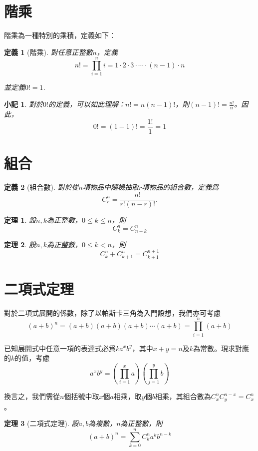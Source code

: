 \documentclass[12pt]{article}
\newtheorem{definition}{定義}
\newtheorem*{theorem}{定理}
\newtheorem*{remark}{小記}
\begin{document}
    \section*{階乘}

    階乘為一種特別的乘積，定義如下：

    \begin{definition}[階乘]
        對任意正整數$n$，定義$$n!=\prod_{i=1}^n i=1\cdot2\cdot3\cdot\cdots\cdot (n-1)\cdot n$$

        並定義$0!=1$.
    \end{definition}

    \begin{remark}
        對於$0!$的定義，可以如此理解：$n!=n(n-1)!$，則$(n-1)!=\frac{n!}{n}$。因此，$$0!=(1-1)!=\frac{1!}{1}=1$$
    \end{remark}

    \section*{組合}

    \begin{definition}[組合數]
        對於從$n$項物品中隨機抽取$r$項物品的組合數，定義爲$$C_r^n=\frac{n!}{r!(n-r)!}.$$
    \end{definition}

    \begin{theorem}
        設$n,k$為正整數，$0\leq k\leq n$，則$$C_k^n=C_{n-k}^n$$
    \end{theorem}

    \begin{theorem}
        設$n,k$為正整數，$0\leq k< n$，則$$C_k^n+C_{k+1}^n=C_{k+1}^{n+1}$$
    \end{theorem}

    \section*{二項式定理}

    對於二項式展開的係數，除了以帕斯卡三角為入門設想，我們亦可考慮$$(a+b)^n=(a+b)(a+b)(a+b)\cdots(a+b)=\prod_{i=1}^{n}(a+b)$$

    已知展開式中任意一項的表達式必爲$ka^xb^y$，其中$x+y=n$及$k$為常數。現求對應的$k$的值，考慮$$a^xb^y=(\prod_{i=1}^{x}a)(\prod_{j=1}^{y}b)$$

    換言之，我們需從$n$個括號中取$x$個$a$相乘，取$y$個$b$相乘，其組合數為$C_x^n C_y^{n-x}=C_x^n$。

    \begin{theorem}[二項式定理]
        設$a,b$為複數，$n$為正整數，則$$(a+b)^n=\sum_{k=0}^{n}C_k^n a^kb^{n-k}$$
    \end{theorem}
\end{document}

